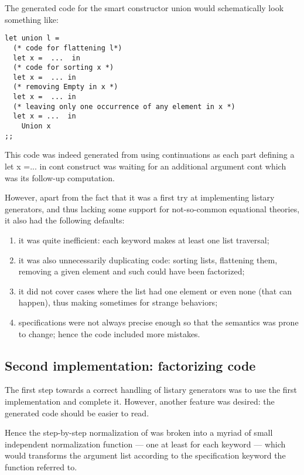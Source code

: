 The generated code for the smart constructor {\sf union} would
schematically look something like:
\begin{lstlisting}[label=lst:firstgen]
  let union l =
  (* code for flattening l*)
  let x =  ...  in
  (* code for sorting x *)
  let x =  ... in
  (* removing Empty in x *)
  let x =  ... in
  (* leaving only one occurrence of any element in x *)
  let x = ...  in
    Union x
;;
\end{lstlisting}

This code was indeed generated from \moca using continuations as each part
defining a {\sf  let x =... in cont} construct
 was waiting for an additional argument {\sf cont} which was its
 follow-up computation. 

However, apart from the fact that it was a first try at implementing
listary generators, and thus lacking some support for not-so-common
equational theories, it also had the following defaults:
\begin{enumerate}
\item \label{it:cont1}
  it was quite inefficient: each keyword makes at least one list
  traversal;

\item \label{it:cont2}
  it was also unnecessarily duplicating code: sorting lists,
  flattening them, removing a given element and such could have been
  factorized; 

\item \label{it:cont3}
  it did not cover cases where the list had one element or even
  none (that can happen), thus making sometimes for strange behaviors;
  
\item \label{it:cont4}
  specifications were not always precise enough so that the
  semantics was prone to change; hence the code included more mistakes.
\end{enumerate}


\subsection{Second implementation: factorizing code}
\label{sec:second_list}
The first step towards a correct handling of listary generators was to
use the first implementation and complete it. However, another feature was
desired: the generated code should be easier to read.

Hence the step-by-step normalization of  was
broken into a myriad of small independent normalization function ---
one at least for each keyword --- which would transforms the argument
list according to the specification keyword the function referred to.

